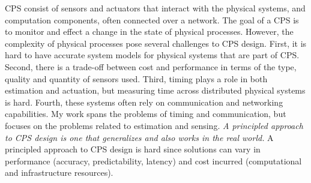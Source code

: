 \documentclass[10pt]{article}
\begin{document}

CPS consist of sensors and actuators that interact with the physical systems, and computation components, often connected over a network.
The goal of a CPS is to monitor and effect a change in the state of physical processes. However, the complexity of physical processes pose several challenges to CPS design.
First, it is hard to have accurate system models for physical systems that are part of CPS. Second, there is a trade-off between cost and performance in terms of the type, quality and quantity of sensors used.  Third, timing plays a role in both estimation and actuation, but measuring time across distributed physical systems is hard. Fourth, these systems often rely on communication and networking capabilities. 
My work spans the problems of timing and communication, but focuses on the problems related to estimation and sensing. 
\textit{A principled approach to CPS design is one that generalizes and also works in the real world.} 
A principled approach to CPS design is hard since solutions can vary in performance (accuracy, predictability, latency) and cost incurred (computational and infrastructure resources). 
\end{document}
